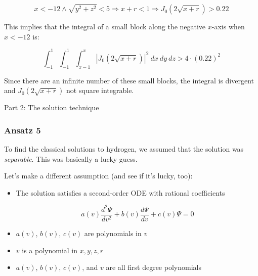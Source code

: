 \documentclass{beamer}
\begin{document}
\begin{frame}
\begin{adjustbox}{raise=-.5cm}
\end{adjustbox}

\[ x<-12 \land \sqrt{y^2+z^2} < 5 \Longrightarrow x+r < 1 \Longrightarrow J_0(2\sqrt{x+r}) > 0.22 \]

This implies that the integral of a small block along the negative $x$-axis when $x<-12$ is:

\[ \int_{-1}^{1} \int_{-1}^{1} \int_{x-1}^{x} \left|J_0(2\sqrt{x+r})\right|^2\ dx\ dy\ dz  > 4 \cdot (0.22)^2 \]

Since there are an infinite number of these small blocks, the integral is divergent
and $J_0(2\sqrt{x+r})$ not square integrable.

\end{frame}

\begin{frame}
\begin{exampleblock}{}
\begin{center}
\vskip 20pt
\Huge
Part 2: The solution technique
\vskip 6pt
\ 
\end{center}
\end{exampleblock}
\end{frame}

\begin{frame}
\frametitle{Ansatz 5}

To find the classical solutions to hydrogen, we assumed that the solution was {\it separable}.
This was basically a lucky guess.

\vskip 12pt

Let's make a different assumption (and see if it's lucky, too):

\vskip 12pt

\begin{itemize}
\item The solution satisfies a second-order ODE with rational coefficients

\[ a(v) \frac{d^2 \Psi}{dv^2} + b(v) \frac{d \Psi}{dv} + c(v) \Psi = 0 \]

\item $a(v)$, $b(v)$, $c(v)$ are polynomials in $v$

\item $v$ is a polynomial in $x,y,z,r$

\item $a(v)$, $b(v)$, $c(v)$, and $v$ are all first degree polynomials
\end{itemize}
\end{frame}
\end{document}

